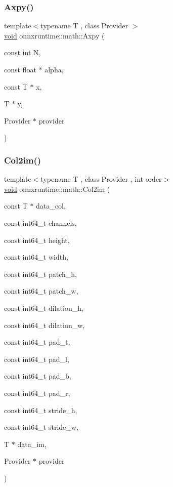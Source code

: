 \subsubsection{\texorpdfstring{Axpy()}{Axpy()}\hspace{0.1cm}{\footnotesize\ttfamily [2/2]}}
{\footnotesize\ttfamily template$<$typename T , class Provider $>$ \\
\mbox{\hyperlink{mlasi_8h_a88f941d423cb2a819b70a1358982b1a6}{void}} onnxruntime\+::math\+::\+Axpy (\begin{DoxyParamCaption}\item[{const int}]{N,  }\item[{const float $\ast$}]{alpha,  }\item[{const T $\ast$}]{x,  }\item[{T $\ast$}]{y,  }\item[{Provider $\ast$}]{provider }\end{DoxyParamCaption})}

\mbox{\label{namespaceonnxruntime_1_1math_a2146d8b8e4933d93cb0934db0ed984a1}} 
\subsubsection{\texorpdfstring{Col2im()}{Col2im()}}
{\footnotesize\ttfamily template$<$typename T , class Provider , int order$>$ \\
\mbox{\hyperlink{mlasi_8h_a88f941d423cb2a819b70a1358982b1a6}{void}} onnxruntime\+::math\+::\+Col2im (\begin{DoxyParamCaption}\item[{const T $\ast$}]{data\+\_\+col,  }\item[{const int64\+\_\+t}]{channels,  }\item[{const int64\+\_\+t}]{height,  }\item[{const int64\+\_\+t}]{width,  }\item[{const int64\+\_\+t}]{patch\+\_\+h,  }\item[{const int64\+\_\+t}]{patch\+\_\+w,  }\item[{const int64\+\_\+t}]{dilation\+\_\+h,  }\item[{const int64\+\_\+t}]{dilation\+\_\+w,  }\item[{const int64\+\_\+t}]{pad\+\_\+t,  }\item[{const int64\+\_\+t}]{pad\+\_\+l,  }\item[{const int64\+\_\+t}]{pad\+\_\+b,  }\item[{const int64\+\_\+t}]{pad\+\_\+r,  }\item[{const int64\+\_\+t}]{stride\+\_\+h,  }\item[{const int64\+\_\+t}]{stride\+\_\+w,  }\item[{T $\ast$}]{data\+\_\+im,  }\item[{Provider $\ast$}]{provider }\end{DoxyParamCaption})}

